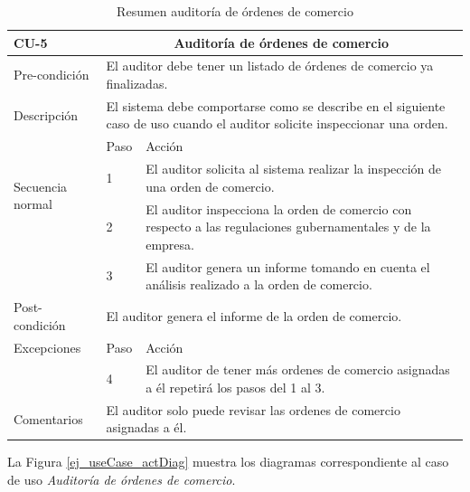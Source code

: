 \begin{itemize}
	\begin{table}[!ht]
		\caption{Resumen auditoría de órdenes de comercio}
		\begin{center}
		\scriptsize{
		\begin{tabular}{ |m{1.5cm}|m{1cm}|m{7cm}|}
		\hline
		\cellcolor{lightgray}\textbf{CU-5} & \multicolumn{2}{|c|}{\cellcolor{lightgray}\textbf{Auditoría de órdenes de comercio}} \\\hline
		Pre-condición & \multicolumn{2}{m{8cm}|}{El auditor debe tener un listado de órdenes de comercio ya finalizadas.} \\\hline
		Descripción & \multicolumn{2}{m{8cm}|}{El sistema debe comportarse como se describe en el siguiente caso de uso cuando el auditor solicite inspeccionar una orden.}\\\hline
		\multirow{3}{1.5cm}{Secuencia normal} & Paso& Acción\\\cline{2-3}
		&1& El auditor solicita al sistema realizar la inspección de una orden de comercio.\\\cline{2-3}
		&2& El auditor inspecciona la orden de comercio con respecto a las regulaciones gubernamentales y de la empresa.\\\cline{2-3}
		&3& El auditor genera un informe tomando en cuenta el análisis realizado a la orden de comercio.\\\hline
		Post-condición&\multicolumn{2}{m{8cm}|}{El auditor genera el informe de la orden de comercio.}\\\hline
		Excepciones & Paso & Acción \\ \cline{2-3}
		&4 & El auditor de tener más ordenes de comercio asignadas a él repetirá los pasos del 1 al 3.\\\hline
		Comentarios & \multicolumn{2}{m{8cm}|}{ El auditor solo puede revisar las ordenes de comercio asignadas a él.} \\\hline
		
		\end{tabular}
		}
		\end{center}
		\label{CU5_descripcion}
	\end{table}
	
	La Figura \ref{ej_useCase_actDiag} muestra los diagramas correspondiente al caso de uso \textit{Auditoría de órdenes de comercio}. 


\end{itemize}
